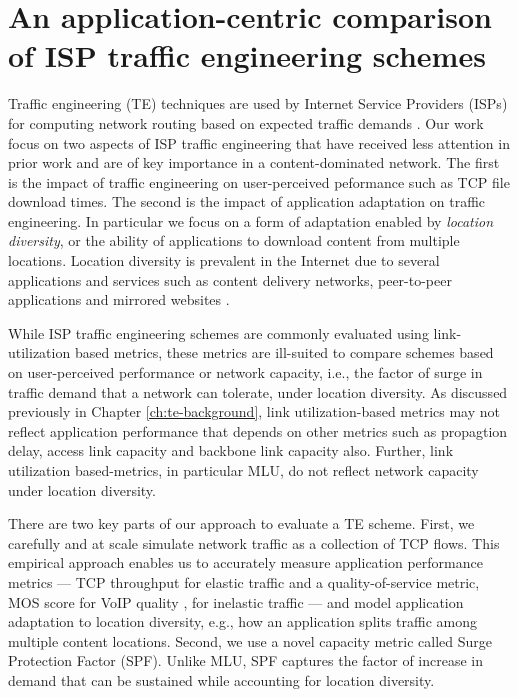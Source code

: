 \chapter{An application-centric comparison of ISP traffic engineering schemes}
\label{ch:beyondmlu}

Traffic engineering (TE) techniques are used by Internet Service Providers (ISPs) for computing network routing based on expected traffic demands \cite{rexford}. Our work focus on two aspects of ISP traffic engineering that have received less attention in prior work and are of key importance in a content-dominated network. The first is the impact of traffic engineering on user-perceived peformance such as TCP file download times. The second is the impact of application adaptation on traffic engineering. In particular we focus on a form of adaptation enabled by \emph{location diversity}, or the ability of applications to download content from multiple locations. Location diversity is prevalent in the Internet due to several applications and services such as content delivery networks, peer-to-peer applications and mirrored websites \cite{akamai-overview,bittorrent}.

While ISP traffic engineering schemes are commonly evaluated using link-utilization based metrics, these metrics are ill-suited to compare schemes based on user-perceived performance or network capacity, i.e., the factor of surge in traffic demand that a network can tolerate, under location diversity. As discussed previously in Chapter \ref{ch:te-background}, link utilization-based metrics may not reflect application performance that depends on other metrics such as propagtion delay, access link capacity and backbone link capacity also. Further, link utilization based-metrics, in particular MLU, do not reflect network capacity under location diversity. 

There are two key parts of our approach to evaluate a TE scheme. First, we carefully and at scale simulate network traffic as a collection of TCP flows. This empirical approach  enables us to accurately measure application performance metrics --- TCP throughput for elastic traffic and a quality-of-service metric,  MOS score for VoIP quality \cite{MOS-formula}, for inelastic traffic --- and model application adaptation to location diversity, e.g., how an application splits traffic among multiple content locations. Second, we use a novel capacity metric called Surge Protection Factor (SPF). Unlike MLU, SPF captures the factor of increase in demand that can be sustained while accounting for location diversity.

